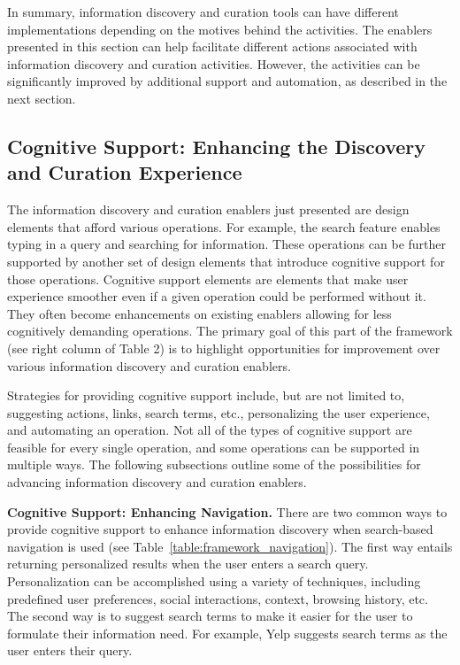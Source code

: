 \documentclass[review]{elsarticle}
\newcommand{\feature}[1]{{\ttfamily#1}}
\begin{document}
{%
In summary, information discovery and curation tools can have different implementations depending on the motives behind the activities. The enablers presented in this section can help facilitate different actions associated with information discovery and curation activities. However, the activities can be significantly improved by additional support and automation, as described in the next section.


{\subsection{Cognitive Support: Enhancing the Discovery and Curation Experience}

The information discovery and curation enablers just presented are design elements that afford various operations. For example, the search feature enables typing in a query and searching for information. These operations can be further supported by another set of design elements that introduce cognitive support for those operations. Cognitive support elements are elements that make user experience smoother even if a given operation could be performed without it. They often become enhancements on existing enablers allowing for less cognitively demanding operations. The primary goal of this part of the framework (see right column of Table 2) is to highlight opportunities for improvement over various information discovery and curation enablers.
%

Strategies for providing cognitive support include, but are not limited to, suggesting actions, links, search terms, etc., personalizing the user experience, and automating an operation. Not all of the types of cognitive support are feasible for every single operation, and some operations can be supported in multiple ways. The following subsections outline some of the possibilities for advancing information discovery and curation enablers. 

{\textbf{Cognitive Support: Enhancing Navigation.}
There are two common ways to provide cognitive support to enhance information discovery when search-based navigation is used (see Table~\ref{table:framework_navigation}). The first way entails returning personalized results when the user enters a search query. \feature{Personalization} can be accomplished using a variety of techniques, including predefined user preferences, social interactions, context, browsing history, etc. The second way is to \feature{suggest search terms} to make it easier for the user to formulate their information need. For example, Yelp suggests search terms as the user enters their query.

}}}
\end{document}
